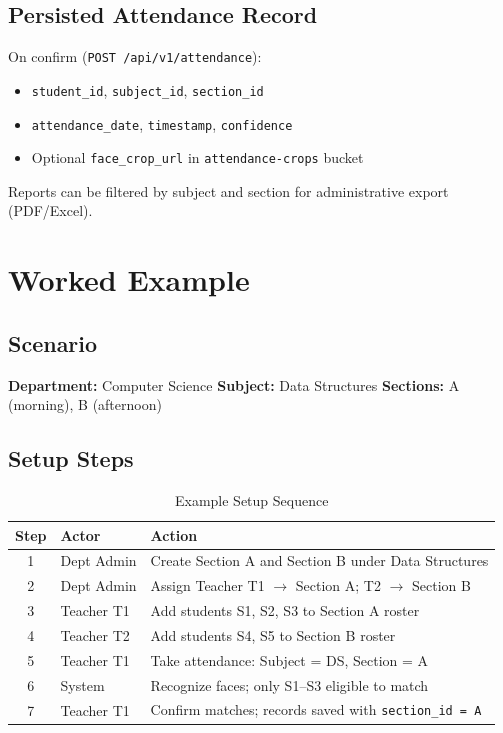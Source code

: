 \documentclass[11pt,a4paper,oneside]{report}
\begin{document}
\section{Persisted Attendance Record}

On confirm (\texttt{POST /api/v1/attendance}):
\begin{itemize}[leftmargin=1.5em]
  \item \texttt{student\_id}, \texttt{subject\_id}, \texttt{section\_id}
  \item \texttt{attendance\_date}, \texttt{timestamp}, \texttt{confidence}
  \item Optional \texttt{face\_crop\_url} in \texttt{attendance-crops} bucket
\end{itemize}

Reports can be filtered by subject and section for administrative export (PDF/Excel).

\chapter{Worked Example}
\label{ch:example}

\section{Scenario}

\textbf{Department:} Computer Science \quad
\textbf{Subject:} Data Structures \quad
\textbf{Sections:} A (morning), B (afternoon)

\section{Setup Steps}

\begin{table}[H]
  \centering
  \caption{Example Setup Sequence}
  \begin{tabular}{@{}clp{7cm}@{}}
    \toprule
    \textbf{Step} & \textbf{Actor} & \textbf{Action} \\
    \midrule
    1 & Dept Admin & Create Section A and Section B under Data Structures \\
    2 & Dept Admin & Assign Teacher T1 $\rightarrow$ Section A; T2 $\rightarrow$ Section B \\
    3 & Teacher T1 & Add students S1, S2, S3 to Section A roster \\
    4 & Teacher T2 & Add students S4, S5 to Section B roster \\
    5 & Teacher T1 & Take attendance: Subject = DS, Section = A \\
    6 & System & Recognize faces; only S1--S3 eligible to match \\
    7 & Teacher T1 & Confirm matches; records saved with \texttt{section\_id = A} \\
    \bottomrule
  \end{tabular}
\end{table}
\end{document}
